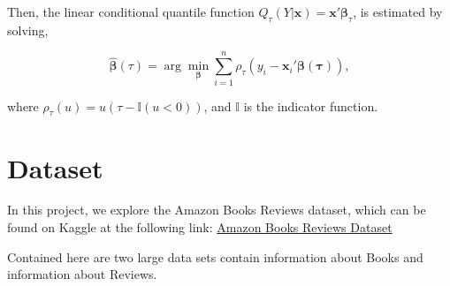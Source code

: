 \documentclass[12pt]{article}
\numberwithin{equation}{section}
\begin{document}
Then, the linear conditional quantile function \( Q_\tau(Y|\mathbf{x}) = \mathbf{x}'\boldsymbol{\beta}_\tau \), is estimated by solving,

\[
\hat{\boldsymbol{\beta}}(\tau) = \arg\min_{\boldsymbol{\beta}} \sum_{i=1}^n \rho_\tau(y_i - \mathbf{x}_i'\boldsymbol{\beta(\tau)}),
\]

where \( \rho_\tau(u) = u(\tau - \mathbb{I}(u < 0)) \), and \( \mathbb{I} \) is the indicator function.


\section{Dataset}

In this project, we explore the Amazon Books Reviews dataset, which can be found on Kaggle at the following link: \href{https://www.kaggle.com/datasets/mohamedbakhet/amazon-books-reviews}{Amazon Books Reviews Dataset}

Contained here are two large data sets contain information about Books and information about Reviews.
\end{document}
